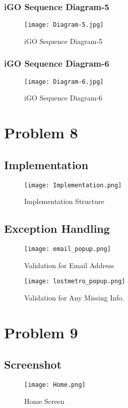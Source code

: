\documentclass[a4paper,12pt]{report}
\begin{document}
\subsection{iGO Sequence Diagram-5}

\begin{figure}[h!]
  \centering
   \texttt{[image: Diagram-5.jpg]}
  \caption{iGO Sequence Diagram-5}
\end{figure}

\subsection{iGO Sequence Diagram-6}

\begin{figure}[h!]
  \centering
   \texttt{[image: Diagram-6.jpg]}
  \caption{iGO Sequence Diagram-6}
\end{figure}

\chapter{Problem 8}
\section{Implementation}
\begin{figure}[h!]
  \centering
   \texttt{[image: Implementation.png]}
  \caption{Implementation Structure}
\end{figure}
\section{Exception Handling}

\begin{figure}[h!]
  \centering
   \texttt{[image: email\_popup.png]}
  \caption{Validation for Email Address}
\end{figure}

\begin{figure}[h!]
  \centering
   \texttt{[image: lostmetro\_popup.png]}
  \caption{Validation for Any Missing Info.}
\end{figure}

\chapter{Problem 9}
\section{Screenshot}
\begin{figure}[h!]
  \centering
   \texttt{[image: Home.png]}
  \caption{Home Screen}
\end{figure}
\end{document}
